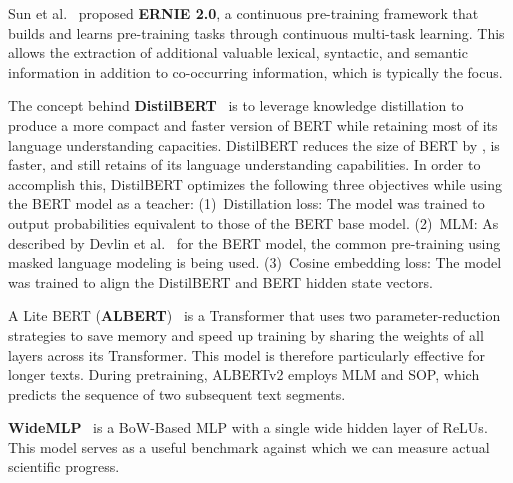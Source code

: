 \documentclass[runningheads]{llncs}
\begin{document}
Sun et al.~\cite{ERNIE} proposed \textbf{ERNIE 2.0}, a continuous pre-training framework that builds and learns pre-training tasks through continuous multi-task learning. 
This allows the extraction of additional valuable lexical, syntactic, and semantic information in addition to co-occurring information, which is typically the focus.

The concept behind \textbf{DistilBERT}~\cite{DISTILBERT} is to leverage knowledge distillation to produce a more compact and faster version of BERT while retaining most of its language understanding capacities. DistilBERT reduces the size of BERT by , is  faster, and still retains  of its language understanding capabilities.
In order to accomplish this, DistilBERT optimizes the following three objectives while using the BERT model as a teacher:
(1)~Distillation loss:
    The model was trained to output probabilities equivalent to those of the BERT base model. 
(2)~\acf{MLM}:
    As described by Devlin et al.~\cite{devlin2018bert} for the BERT model, the common pre-training using masked language modeling is being used.
(3)~Cosine embedding loss: The model was trained to align the DistilBERT and BERT hidden state vectors.

A Lite BERT (\textbf{ALBERT})~\cite{albert2019} is a Transformer that uses two parameter-reduction strategies to save memory and speed up training by sharing the weights of all layers across its Transformer. 
This model is therefore particularly effective for longer texts. 
During pretraining, ALBERTv2 employs \ac{MLM} and \ac{SOP}, which predicts the sequence of two subsequent text segments.

\textbf{WideMLP}~\cite{galkeMLP} is a \ac{BoW}-Based \ac{MLP} with a single wide hidden layer of  \acp{ReLU}. 
This model serves as a useful benchmark against which we can measure actual scientific progress.
\end{document}
